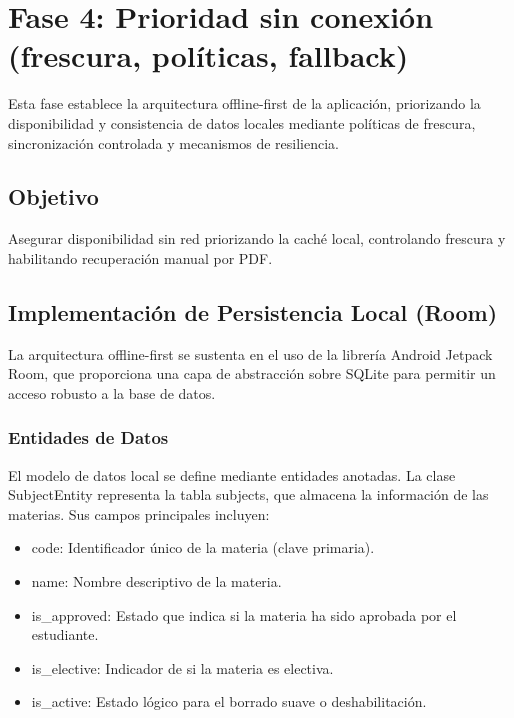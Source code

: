 \section{Fase 4: Prioridad sin conexión (frescura, políticas, fallback)}

Esta fase establece la arquitectura offline-first de la aplicación, priorizando la disponibilidad y consistencia de datos locales mediante políticas de frescura, sincronización controlada y mecanismos de resiliencia.

\subsection{Objetivo}
Asegurar disponibilidad sin red priorizando la caché local, controlando frescura y habilitando recuperación manual por PDF.

\subsection{Implementación de Persistencia Local (Room)}
La arquitectura offline-first se sustenta en el uso de la librería Android Jetpack Room, que proporciona una capa de abstracción sobre SQLite para permitir un acceso robusto a la base de datos.

\subsubsection{Entidades de Datos}
El modelo de datos local se define mediante entidades anotadas. La clase SubjectEntity representa la tabla subjects, que almacena la información de las materias. Sus campos principales incluyen:
\begin{itemize}
    \item code: Identificador único de la materia (clave primaria).
    \item name: Nombre descriptivo de la materia.
    \item is\_approved: Estado que indica si la materia ha sido aprobada por el estudiante.
    \item is\_elective: Indicador de si la materia es electiva.
    \item is\_active: Estado lógico para el borrado suave o deshabilitación.
\end{itemize}

